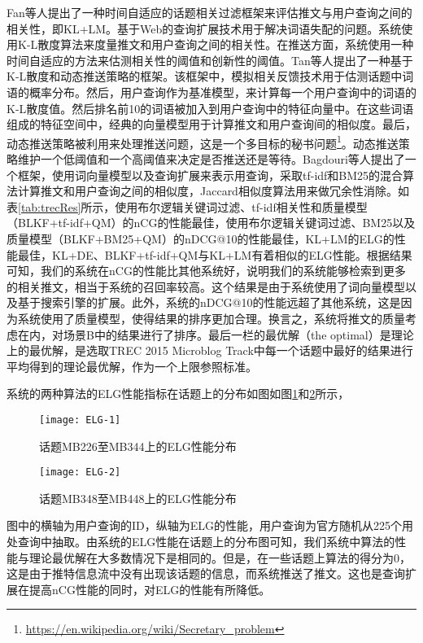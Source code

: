 Fan等人提出了一种时间自适应的话题相关过滤框架来评估推文与用户查询之间的相关性，即KL+LM。基于Web的查询扩展技术用于解决词语失配的问题。系统使用K-L散度算法来度量推文和用户查询之间的相关性。在推送方面，系统使用一种时间自适应的方法来估测相关性的阈值和创新性的阈值。Tan等人提出了一种基于K-L散度和动态推送策略的框架。该框架中，模拟相关反馈技术用于估测话题中词语的概率分布。然后，用户查询作为基准模型，来计算每一个用户查询中的词语的K-L散度值。然后排名前10的词语被加入到用户查询中的特征向量中。在这些词语组成的特征空间中，经典的向量模型用于计算推文和用户查询间的相似度。最后，动态推送策略被利用来处理推送问题，这是一个多目标的秘书问题\footnote{\url{https://en.wikipedia.org/wiki/Secretary_problem}}。动态推送策略维护一个低阈值和一个高阈值来决定是否推送还是等待。Bagdouri等人提出了一个框架，使用词向量模型以及查询扩展来表示用查询，采取tf-idf和BM25的混合算法计算推文和用户查询之间的相似度，Jaccard相似度算法用来做冗余性消除。如表\ref{tab:trecRes}所示，使用布尔逻辑关键词过滤、tf-idf相关性和质量模型（BLKF+tf-idf+QM）的nCG的性能最佳，使用布尔逻辑关键词过滤、BM25以及质量模型（BLKF+BM25+QM）的nDCG@10的性能最佳，KL+LM的ELG的性能最佳，KL+DE、BLKF+tf-idf+QM与KL+LM有着相似的ELG性能。根据结果可知，我们的系统在nCG的性能比其他系统好，说明我们的系统能够检索到更多的相关推文，相当于系统的召回率较高。这个结果是由于系统使用了词向量模型以及基于搜索引擎的扩展。此外，系统的nDCG@10的性能远超了其他系统，这是因为系统使用了质量模型，使得结果的排序更加合理。换言之，系统将推文的质量考虑在内，对场景B中的结果进行了排序。最后一栏的最优解（the optimal）是理论上的最优解，是选取TREC 2015 Microblog Track中每一个话题中最好的结果进行平均得到的理论最优解，作为一个上限参照标准。

系统的两种算法的ELG性能指标在话题上的分布如图如图\ref{fig:elg1}和\ref{fig:elg2}所示，
\begin{figure}[!htbp]
  \centering
  \texttt{[image: ELG-1]}
  \caption{话题MB226至MB344上的ELG性能分布}
  \label{fig:elg1}
\end{figure}
\begin{figure}[!htbp]
  \centering
  \texttt{[image: ELG-2]}
  \caption{话题MB348至MB448上的ELG性能分布}
  \label{fig:elg2}
\end{figure}
图中的横轴为用户查询的ID，纵轴为ELG的性能，用户查询为官方随机从225个用处查询中抽取。由系统的ELG性能在话题上的分布图可知，我们系统中算法的性能与理论最优解在大多数情况下是相同的。但是，在一些话题上算法的得分为0，这是由于推特信息流中没有出现该话题的信息，而系统推送了推文。这也是查询扩展在提高nCG性能的同时，对ELG的性能有所降低。

